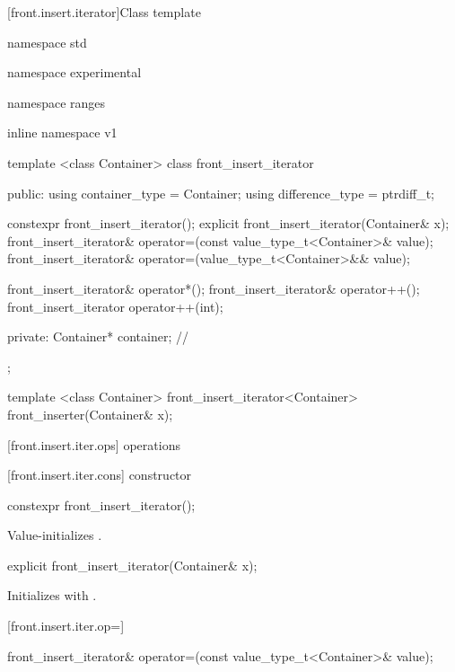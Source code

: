 [front.insert.iterator]{Class template }

%
\begin{codeblock}
namespace std { namespace experimental { namespace ranges { inline namespace v1 {
  template <class Container>
  class front_insert_iterator {
  public:
    using container_type = Container;
    using difference_type = ptrdiff_t;

    constexpr front_insert_iterator();
    explicit front_insert_iterator(Container& x);
    front_insert_iterator&
      operator=(const value_type_t<Container>& value);
    front_insert_iterator&
      operator=(value_type_t<Container>&& value);

    front_insert_iterator& operator*();
    front_insert_iterator& operator++();
    front_insert_iterator operator++(int);

  private:
    Container* container; // \expos
  };

  template <class Container>
    front_insert_iterator<Container> front_inserter(Container& x);
}}}}
\end{codeblock}

[front.insert.iter.ops]{ operations}

[front.insert.iter.cons]{ constructor}

%
\begin{itemdecl}
constexpr front_insert_iterator();
\end{itemdecl}

\begin{itemdescr}
\pnum
\effects
Value-initializes
.
\end{itemdescr}

%
\begin{itemdecl}
explicit front_insert_iterator(Container& x);
\end{itemdecl}

\begin{itemdescr}
\pnum
\effects
Initializes
with .
\end{itemdescr}

[front.insert.iter.op=]{}

%
\begin{itemdecl}
front_insert_iterator&
  operator=(const value_type_t<Container>& value);
\end{itemdecl}

